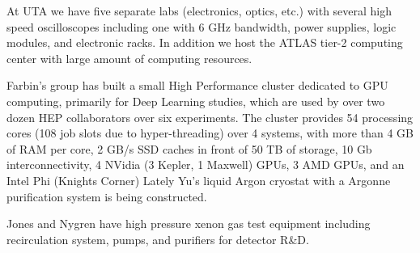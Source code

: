 \begin{center}
At UTA we have five separate labs (electronics, optics, etc.) with several high speed oscilloscopes including one with 6 GHz bandwidth, power supplies, logic modules, and electronic racks.
In addition we host the ATLAS tier-2 computing center with large amount of computing resources.

Farbin's group has built a small High Performance cluster dedicated to                                                                                                              
GPU computing, primarily for Deep Learning studies, which are used by
over two dozen HEP collaborators over six experiments. The cluster
provides 54 processing cores (108 job slots due to hyper-threading) 
over 4 systems, with more than 4 GB of RAM per core, 2 GB/s SSD caches
in front of 50 TB of storage, 10 Gb interconnectivity, 4 NVidia (3 
Kepler, 1 Maxwell) GPUs, 3 AMD GPUs, and an Intel Phi (Knights
Corner)
Lately Yu's liquid Argon cryostat with a Argonne purification system is being constructed.

Jones and Nygren have high pressure xenon gas test equipment including recirculation system, pumps, and purifiers for detector R\&D. 
\end{center}

